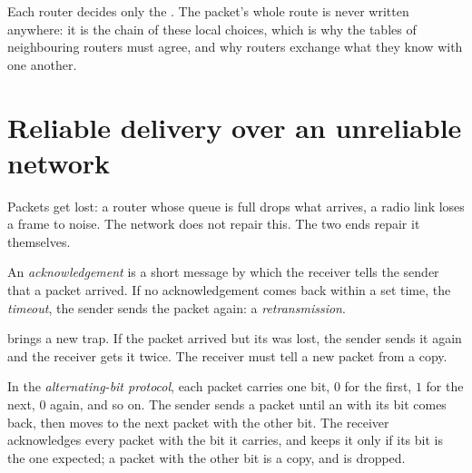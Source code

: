 \label{lst:g11:network-protocols:route-lookup}

\label{out:g11:network-protocols:route-lookup}

Each router decides only the . The packet's whole route is never written anywhere: it is the chain of these
local choices, which is why the tables of neighbouring routers must agree, and why routers exchange what they know
with one another.

\section{Reliable delivery over an unreliable network}\label{sec:g11:network-protocols:reliable}

Packets get lost: a router whose queue is full drops what arrives, a radio link loses a frame to noise. The network
 does not repair this. The two ends repair it themselves.

\begin{definition}\label{def:g11:network-protocols:ack}
An \emph{acknowledgement} is a short message by which the receiver tells the sender that a
packet arrived. If no acknowledgement comes back within a set time, the \emph{timeout}, the sender
sends the packet again: a \emph{retransmission}.
\end{definition}

 brings a new trap. If the packet arrived but its  was lost, the sender sends it again
and the receiver gets it twice. The receiver must tell a new packet from a copy.

\begin{definition}\label{def:g11:network-protocols:alternating-bit}
In the \emph{alternating-bit protocol}, each packet carries one bit, $0$ for the first,
$1$ for the next, $0$ again, and so on. The sender sends a packet until an  with its bit comes back,
then moves to the next packet with the other bit. The receiver acknowledges every packet with the bit it carries, and
keeps it only if its bit is the one expected; a packet with the other bit is a copy, and is dropped.
\end{definition}

